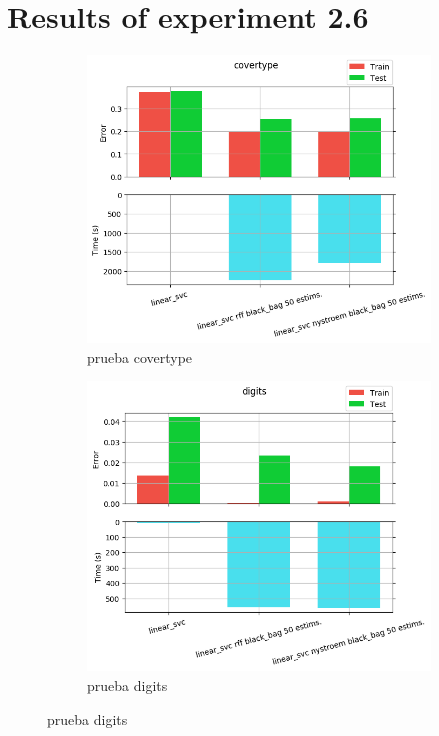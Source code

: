 
\chapter{Results of experiment 2.6} %

\label{Appendix2-6} %

\begin{figure}[ht]
  \centering
  \begin{subfigure}[b]{0.5\linewidth}
    \centering\captionsetup{width=.8\linewidth}\includegraphics[width=\imgscale\linewidth]{Figures/2_6/covertype}
    \caption{prueba covertype}
    \label{fig:2_6_covertype}
  \end{subfigure}%
  \begin{subfigure}[b]{0.5\linewidth}
    \centering\captionsetup{width=.8\linewidth}\includegraphics[width=\imgscale\linewidth]{Figures/2_6/digits}
    \caption{prueba digits}
    \label{fig:2_6_digits}
  \end{subfigure}
\end{figure}


